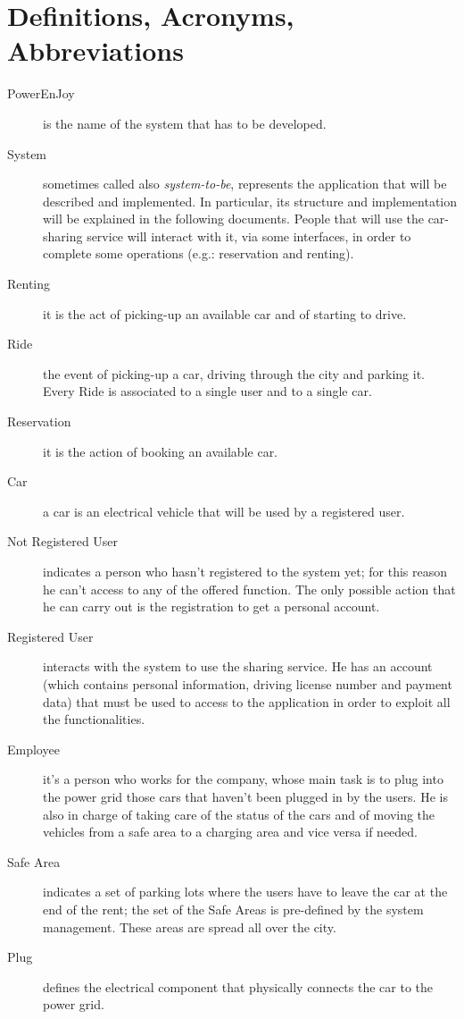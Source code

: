 \documentclass[11pt,a4paper]{report}
\begin{document}
\section{Definitions, Acronyms, Abbreviations}
\begin{description}
	\item[PowerEnJoy]is the name of the system that has to be developed.
	\item[System]sometimes called also \textit{system-to-be}, represents the application that will be described and implemented.
	In particular, its structure and implementation will be explained in the following documents. People that will use the car-sharing service will interact with it, via some interfaces, in order to complete some operations (e.g.: reservation and renting).
	\item[Renting]it is the act of picking-up an available car and of starting to drive.
	\item[Ride] the event of picking-up a car, driving through the city and parking it. Every Ride is associated to a single user and to a single car.
	\item[Reservation]it is the action of booking an available car.
	\item[Car] a car is an electrical vehicle that will be used by a registered user.
	\item[Not Registered User] indicates a person who hasn't registered to the system yet; for this reason he can't access to any of the offered function. The only possible action that he can carry out is the registration to get a personal account.
	\item[Registered User] interacts with the system to use the sharing service. He has an account (which contains personal information, driving license number and payment data) that must be used to access to the application in order to exploit all the functionalities.
	\item[Employee] it's a person who works for the company, whose main task is to plug into the power grid those cars that haven't been plugged in by the users. He is also in charge of taking care of the status of the cars and of moving the vehicles from a safe area to a charging area and vice versa if needed.
	\item[Safe Area] indicates a set of parking lots where the users have to leave the car at the end of the rent; the set of the Safe Areas is pre-defined by the system management. These areas are spread all over the city.
	\item[Plug] defines the electrical component that physically connects the car to the power grid.

\end{description}
\end{document}

